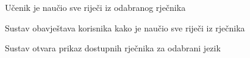 \begin{packed_item}
\begin{packed_item}
\begin{packed_enum}
							\end{packed_enum}
							
							\item[1.c] Učenik je naučio sve riječi iz odabranog rječnika
							\item[] \begin{packed_enum}
								
								\item Sustav obavještava korisnika kako je naučio sve riječi iz rječnika
								\item Sustav otvara prikaz dostupnih rječnika za odabrani jezik
								
							\end{packed_enum}
							
						\end{packed_item}
					\end{packed_item}
					
